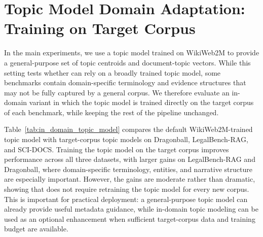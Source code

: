 \section{Topic Model Domain Adaptation: Training on Target Corpus}
\label{app:in_domain_topic_model}

In the main experiments, we use a topic model trained on WikiWeb2M to provide a general-purpose set of topic centroids and document-topic vectors. While this setting tests whether \name{} can rely on a broadly trained topic model, some benchmarks contain domain-specific terminology and evidence structures that may not be fully captured by a general corpus. We therefore evaluate an in-domain variant in which the topic model is trained directly on the target corpus of each benchmark, while keeping the rest of the \name{} pipeline unchanged.

Table~\ref{tab:in_domain_topic_model} compares the default WikiWeb2M-trained topic model with target-corpus topic models on Dragonball, LegalBench-RAG, and SCI-DOCS. Training the topic model on the target corpus improves performance across all three datasets, with larger gains on LegalBench-RAG and Dragonball, where domain-specific terminology, entities, and narrative structure are especially important. However, the gains are moderate rather than dramatic, showing that \name{} does not require retraining the topic model for every new corpus. This is important for practical deployment: a general-purpose topic model can already provide useful metadata guidance, while in-domain topic modeling can be used as an optional enhancement when sufficient target-corpus data and training budget are available.

